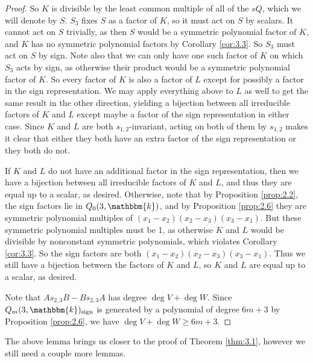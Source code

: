 \documentclass[11pt]{article}
\numberwithin{equation}{section}
\theoremstyle{definition}
\numberwithin{equation}{section}
\renewcommand{\k}{\mathbbm{k}}
\newcommand{\sgn}{\mathrm{sign}}
\begin{document}
\begin{proof}
    So $K$ is divisible by the least common multiple of all of the $sQ$, which we will denote by $S$. $S_3$ fixes $S$ as a factor of $K$, so it must act on $S$ by scalars. It cannot act on $S$ trivially, as then $S$ would be a symmetric polynomial factor of $K$, and $K$ has no symmetric polynomial factors by Corollary \ref{cor:3.3}. So $S_3$ must act on $S$ by sign. Note also that we can only have one such factor of $K$ on which $S_3$ acts by sign, as otherwise their product would be a symmetric polynomial factor of $K$. So every factor of $K$ is also a factor of $L$ except for possibly a factor in the sign representation. We may apply everything above to $L$ as well to get the same result in the other direction, yielding a bijection between all irreducible factors of $K$ and $L$ except maybe a factor of the sign representation in either case. Since $K$ and $L$ are both $s_{1,2}$-invariant, acting on both of them by $s_{1,2}$ makes it clear that either they both have an extra factor of the sign representation or they both do not.
    
    If $K$ and $L$ do not have an additional factor in the sign representation, then we have a bijection between all irreducible factors of $K$ and $L$, and thus they are equal up to a scalar, as desired. Otherwise, note that by Proposition \ref{prop:2.2}, the sign factors lie in $Q_0(3,\k)$, and by Proposition \ref{prop:2.6} they are symmetric polynomial multiples of $(x_1-x_2)(x_2-x_3)(x_3-x_1)$. But these symmetric polynomial multiples must be 1, as otherwise $K$ and $L$ would be divisible by nonconstant symmetric polynomials, which violates Corollary \ref{cor:3.3}. So the sign factors are both $(x_1-x_2)(x_2-x_3)(x_3-x_1)$. Thus we still have a bijection between the factors of $K$ and $L$, so $K$ and $L$ are equal up to a scalar, as desired.
    
    Note that $As_{2,3}B-Bs_{2,3}A$ has degree $\deg V+\deg W$. Since $Q_m(3,\k)_\sgn$ is generated by a polynomial of degree $6m+3$ by Proposition \ref{prop:2.6}, we have $\deg V+\deg W\geq 6m+3$.
\end{proof}

The above lemma brings us closer to the proof of Theorem \ref{thm:3.1}, however we still need a couple more lemmas.
\end{document}
